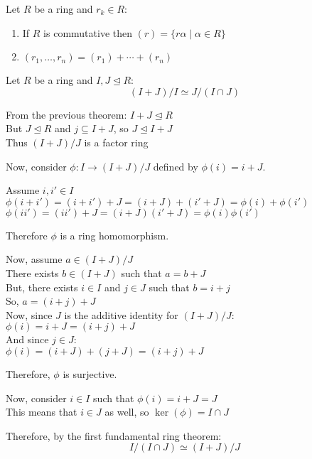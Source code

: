 \documentclass[letterpaper,12pt,fleqn]{article}
\newcommand{\ide}{\trianglelefteq}
\begin{document}
\begin{properties}
  Let $R$ be a ring and $r_k\in R$:
  \begin{enumerate}
  \item If $R$ is commutative then $(r)=\{r\alpha\mid\alpha\in R\}$
  \item $(r_1,\ldots,r_n)=(r_1)+\cdots+(r_n)$
  \end{enumerate}
\end{properties}

\begin{theorem}
  Let $R$ be a ring and $I,J\ide R$:
  \[(I+J)/I\simeq J/(I\cap J)\]
\end{theorem}

\begin{theproof}
  From the previous theorem: $I+J\ide R$ \\
  But $J\ide R$ and $j\subseteq I+J$, so $J\ide I+J$ \\
  Thus $(I+J)/J$ is a factor ring
  
  Now, consider $\phi:I\to(I+J)/J$ defined by $\phi(i)=i+J$.

  Assume $i,i'\in I$ \\
  $\phi(i+i')=(i+i')+J=(i+J)+(i'+J)=\phi(i)+\phi(i')$ \\
  $\phi(ii')=(ii')+J=(i+J)(i'+J)=\phi(i)\phi(i')$

  Therefore $\phi$ is a ring homomorphism.

  Now, assume $a\in(I+J)/J$ \\
  There exists $b\in(I+J)$ such that $a=b+J$ \\
  But, there exists $i\in I$ and $j\in J$ such that $b=i+j$ \\
  So, $a=(i+j)+J$ \\
  Now, since $J$ is the additive identity for $(I+J)/J$: \\
  $\phi(i)=i+J=(i+j)+J$ \\
  And since $j\in J$: \\
  $\phi(i)=(i+J)+(j+J)=(i+j)+J$

  Therefore, $\phi$ is surjective.

  Now, consider $i\in I$ such that $\phi(i)=i+J=J$ \\
  This means that $i\in J$ as well, so $\ker(\phi)=I\cap J$

  Therefore, by the first fundamental ring theorem:
  \[I/(I\cap J)\simeq(I+J)/J\]
\end{theproof}
\end{document}
